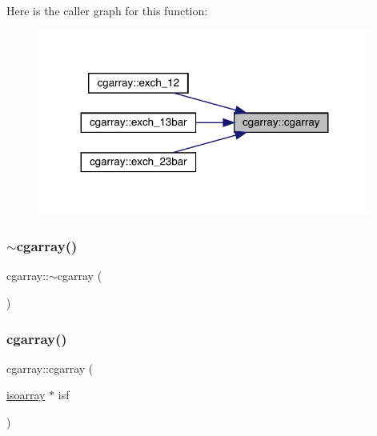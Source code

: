 Here is the caller graph for this function\+:\nopagebreak
\begin{figure}[H]
\begin{center}
\leavevmode
\includegraphics[width=311pt]{d7/d55/classcgarray_a0a9d804cf3256428f8d8937749a8b776_icgraph}
\end{center}
\end{figure}
\mbox{\label{classcgarray_af332defc2438028410ad8e2ae98aa848}} 
\subsubsection{\texorpdfstring{$\sim$cgarray()}{~cgarray()}\hspace{0.1cm}{\footnotesize\ttfamily [1/3]}}
{\footnotesize\ttfamily cgarray\+::$\sim$cgarray (\begin{DoxyParamCaption}{ }\end{DoxyParamCaption})}

\mbox{\label{classcgarray_a0a9d804cf3256428f8d8937749a8b776}} 
\subsubsection{\texorpdfstring{cgarray()}{cgarray()}\hspace{0.1cm}{\footnotesize\ttfamily [2/3]}}
{\footnotesize\ttfamily cgarray\+::cgarray (\begin{DoxyParamCaption}\item[{\mbox{\hyperlink{classisoarray}{isoarray}} $\ast$}]{isf }\end{DoxyParamCaption})}

\mbox{\label{classcgarray_af332defc2438028410ad8e2ae98aa848}} 
